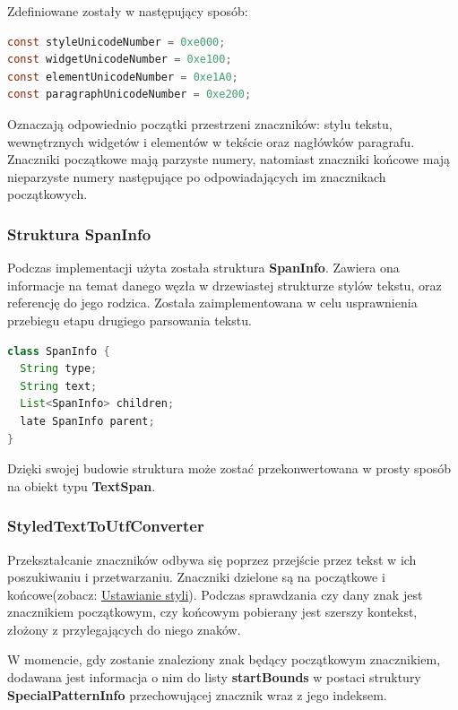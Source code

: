 \noindent Zdefiniowane zostały w następujący sposób:

\begin{lstlisting}[language=java]
const styleUnicodeNumber = 0xe000;
const widgetUnicodeNumber = 0xe100;
const elementUnicodeNumber = 0xe1A0;
const paragraphUnicodeNumber = 0xe200;
\end{lstlisting}

Oznaczają odpowiednio początki przestrzeni znaczników: stylu tekstu, wewnętrznych widgetów i elementów w tekście oraz nagłówków paragrafu.
Znaczniki początkowe mają parzyste numery, natomiast znaczniki końcowe mają nieparzyste numery następujące po odpowiadających im znacznikach początkowych.

\newpage

\subsubsection{Struktura SpanInfo}

Podczas implementacji użyta została struktura \textbf{SpanInfo}. Zawiera ona informacje na temat danego węzła w drzewiastej strukturze stylów tekstu, oraz referencję do jego rodzica.
Została zaimplementowana w celu usprawnienia przebiegu etapu drugiego parsowania tekstu.

\begin{lstlisting}[language=java]
class SpanInfo {
  String type;
  String text;
  List<SpanInfo> children;
  late SpanInfo parent;
}
\end{lstlisting}

Dzięki swojej budowie struktura może zostać przekonwertowana w prosty sposób na obiekt typu \textbf{TextSpan}.

\subsubsection{StyledTextToUtfConverter}

Przekształcanie znaczników odbywa się poprzez przejście przez tekst w ich poszukiwaniu i przetwarzaniu. Znaczniki dzielone są na początkowe i końcowe(zobacz: \hyperref[subsec:ustawianieStyli]{Ustawianie styli}). Podczas sprawdzania czy dany znak jest znacznikiem początkowym, czy końcowym pobierany jest szerszy kontekst, złożony z przylegających do niego znaków.

W momencie, gdy zostanie znaleziony znak będący początkowym znacznikiem, dodawana jest informacja o nim do listy \textbf{startBounds} w postaci struktury \textbf{SpecialPatternInfo} przechowującej znacznik wraz z jego indeksem.

